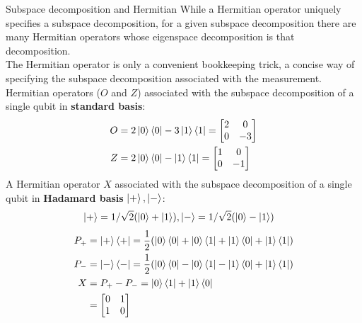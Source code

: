 \documentclass{beamer}
\begin{document}
\begin{frame}{Subspace decomposition and Hermitian}
  {\tiny
    While a Hermitian operator uniquely specifies a subspace decomposition,
    for a given subspace decomposition there are many Hermitian operators whose eigenspace decomposition is that decomposition.\\
    The Hermitian operator is only a convenient bookkeeping trick, a concise way of specifying the subspace decomposition associated with the measurement.\\
    Hermitian operators ($O$ and $Z$) associated with the subspace decomposition of a single qubit in \textbf{standard basis}:
    \begin{align*}
      O &= 2 \ket0 \bra0 - 3 \ket1 \bra1
        = \begin{bmatrix}
             2 & 0 \\
             0 & -3
           \end{bmatrix} \\
      Z &= 2 \ket0 \bra0 - \ket1 \bra1
        = \begin{bmatrix}
             1 & 0 \\
             0 & -1
           \end{bmatrix}
    \end{align*}
    A Hermitian operator $X$ associated with the subspace decomposition of a single qubit in \textbf{Hadamard basis} {$\ket+, \ket-$}:
    \begin{align*}
      \ket+ = 1/\sqrt2 ( \ket0 + \ket1), & \ket- = 1/\sqrt2 ( \ket0 - \ket1)
    \end{align*}
    \begin{align*}
      P_+ &= \ket+ \bra+ = \frac{1}{2} ( \ket0\bra0 + \ket0\bra1 + \ket1\bra0 + \ket1\bra1 ) \\
      P_- &= \ket- \bra- = \frac{1}{2} ( \ket0\bra0 - \ket0\bra1 - \ket1\bra0 + \ket1\bra1 ) \\
      X &= P_+ - P_- = \ket0\bra1 + \ket1\bra0 \\
      &= \begin{bmatrix}
        0 & 1 \\
        1 & 0
      \end{bmatrix}
    \end{align*}
  }%
\end{frame}
\end{document}
